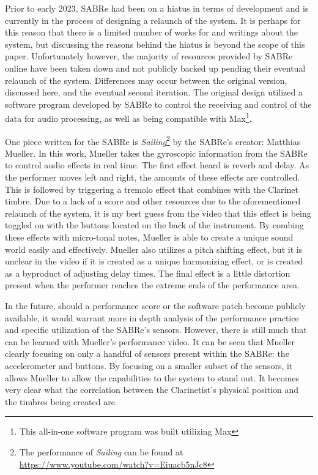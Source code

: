 Prior to early 2023, SABRe had been on a hiatus in terms of development and is currently in the process of designing a relaunch of the system. It is perhaps for this reason that there is a limited number of works for and writings about the system, but discussing the reasons behind the hiatus is beyond the scope of this paper. Unfortunately however, the majority of resources provided by SABRe online have been taken down and not publicly backed up pending their eventual relaunch of the system. Differences may occur between the original version, discussed here, and the eventual second iteration. The original design utilized a software program developed by SABRe to control the receiving and control of the data for audio processing, as well as being compatible with Max\footnote{This all-in-one software program was built utilizing Max}. 


One piece written for the SABRe is \textit{Sailing}\footnote{The performance of \textit{Sailing} can be found at \url{https://www.youtube.com/watch?v=Eiuacb5nJc8}} by the SABRe's creator: Matthias Mueller. In this work, Mueller takes the gyroscopic information from the SABRe to control audio effects in real time. The first effect heard is reverb and delay. As the performer moves left and right, the amounts of these effects are controlled. This is followed by triggering a tremolo effect that combines with the Clarinet timbre. Due to a lack of a score and other resources due to the aforementioned relaunch of the system, it is my best guess from the video that this effect is being toggled on with the buttons located on the back of the instrument. By combing these effects with micro-tonal notes, Mueller is able to create a unique sound world easily and effectively. Mueller also utilizes a pitch shifting effect, but it is unclear in the video if it is created as a unique harmonizing effect, or is created as a byproduct of adjusting delay times. The final effect is a little distortion present when the performer reaches the extreme ends of the performance area.

In the future, should a performance score or the software patch become publicly available, it would warrant more in depth analysis of the performance practice and specific utilization of the SABRe's sensors. However, there is still much that can be learned with Mueller's performance video. It can be seen that Mueller clearly focusing on only a handful of sensors present within the SABRe: the accelerometer and buttons. By focusing on a smaller subset of the sensors, it allows Mueller to allow the capabilities to the system to stand out. It becomes very clear what the correlation between the Clarinetist's physical position and the timbres being created are.

